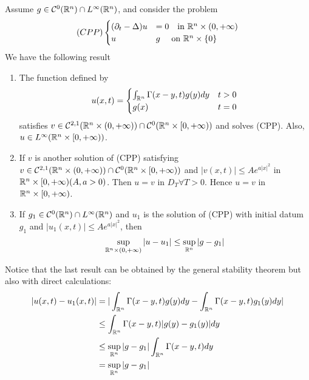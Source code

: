 \begin{PropBox}
    \begin{Cor}
    Assume $g \in \mathcal{C}^0(\mathbb{R}^n) \cap L^\infty(\mathbb{R}^n)$, and consider the problem
    \begin{equation*}
    (CPP)
        \begin{cases}
            (\partial_t - \Delta) u&=0 \quad \text{in } \mathbb{R}^n \times (0,+\infty)\\
            u&g \quad \text{ on } \mathbb{R}^n \times \{0\}
        \end{cases}
    \end{equation*}
    We have the following result 
    \begin{enumerate}
        \item The function defined by 
        \begin{equation*}
        u(x,t) = 
            \begin{cases}
                \int_{\mathbb{R}^n} \Gamma(x-y,t) g(y) dy & t > 0\\
                g(x) & t= 0
            \end{cases}
        \end{equation*}
        satisfies $v \in \mathcal{C}^{2,1}(\mathbb{R}^n \times (0,+\infty)) \cap \mathcal{C}^0(\mathbb{R}^n \times [0,+\infty))$ and solves (CPP). Also, $u \in L^\infty(\mathbb{R}^n \times [0,+\infty))$.
        \item If $v$ is another solution of (CPP) satisfying $v \in \mathcal{C}^{2,1}(\mathbb{R}^n \times (0,+\infty)) \cap \mathcal{C}^0(\mathbb{R}^n \times [0,+\infty))$ and $|v(x,t)| \leq A e^{a |x|^2}$ in $\mathbb{R}^n \times [0,+\infty) (A,a > 0)$. Then $u = v$ in $D_T \forall T > 0$. Hence $u=v$ in $\mathbb{R}^n \times [0,+\infty)$. 
        \item If $g_1 \in \mathcal{C}^0(\mathbb{R}^n) \cap L^\infty(\mathbb{R}^n)$ and $u_1$ is the solution of (CPP) with initial datum $g_1$ and $|u_1(x,t)| \leq A e^{a |x|^2}$, then 
        \begin{equation*}
            \sup_{\mathbb{R}^n \times (0,+\infty)} |u-u_1| \leq \sup_{\mathbb{R}^n} |g-g_1|
        \end{equation*}
    \end{enumerate}
    \end{Cor}
\end{PropBox}
Notice that the last result can be obtained by the general stability theorem but also with direct calculations:
\begin{align*}
    |u(x,t) - u_1(x,t)| &= |\int_{\mathbb{R}^n} \Gamma(x-y,t) g(y) dy - \int_{\mathbb{R}^n} \Gamma(x-y,t)g_1(y) dy| \\
    &\leq \int_{\mathbb{R}^n} \Gamma(x-y,t) |g(y)-g_1(y)| dy \\
    &\leq \sup_{\mathbb{R}^n} |g-g_1| \int_{\mathbb{R}^n} \Gamma(x-y,t) dy \\
    &= \sup_{\mathbb{R}^n} |g-g_1|
\end{align*}



